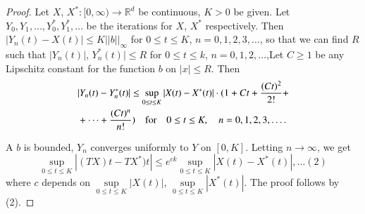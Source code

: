 \begin{proof}
Let $X$, $X^{*}:[0,\infty)\to \mathbb{R}^{d}$ be continuous, $K>0$ be
  given. Let $Y_{0},Y_{1},\ldots,Y_{0}^{*},Y^{*}_{1},\ldots$ be the
  iterations for $X$, $X^{*}$ respectively. Then $|Y_{n}(t)-X(t)|\leq
  K||b||_{\infty}$ for $0\leq t\leq K$, $n=0,1,2,3,\ldots$, so that we
  can find $R$ such that $|Y_{n}(t)|$, $Y^{*}_{n}(t)|\leq R$ for
  $0\leq t\leq k$, $n=0,1,2,\ldots$,\pageoriginale Let $C\geq 1$ be
  any Lipschitz constant for the function $b$ on $|x|\leq R$. Then
\begin{align*}
& |Y_{n}(t)-Y^{*}_{n}(t)|\leq \sup\limits_{0\leq t\leq
    K}|X(t)-X^{*}(t)|\cdot (1+Ct+\frac{(Ct)^{2}}{2!}+\\
& +\cdots +\frac{(Ct)^{n}}{n!})\quad\text{for}\quad 0\leq t\leq K,\quad
  n=0,1,2,3,\ldots .
\end{align*}

A $b$ is bounded, $Y_{n}$ converges uniformly to $Y$ on
$[0,K]$. Letting $n\to \infty$, we get
$$
\sup\limits_{0\leq t\leq K}|(TX)t-TX^{*})t|\leq
e^{ck}\sup\limits_{0\leq t\leq K}|X(t)-X^{*}(t)|,\ldots(2)
$$
where $c$ depends on $\sup\limits_{0\leq t\leq K}|X(t)|$,
$\sup\limits_{0\leq t\leq K}|X^{*}(t)|$. The proof follows by (2).
\end{proof}
